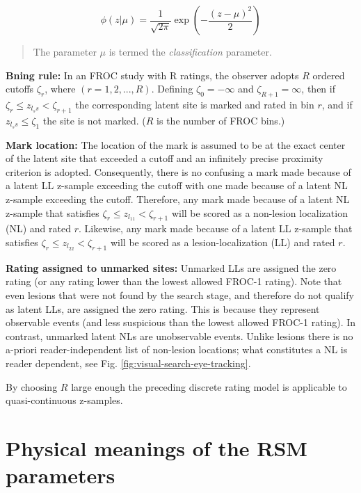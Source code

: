 \documentclass[
]{book}
\begin{document}
\begin{equation} 
\phi\left ( z | \mu \right )=\frac{1}{\sqrt{2\pi}}\exp\left ( -\frac{(z-\mu)^2}{2} \right )
\label{eq:rsm-pdf-phi-mu}
\end{equation}

\begin{quote}
The parameter \(\mu\) is termed the \emph{classification} parameter.
\end{quote}

\textbf{Bning rule:} In an FROC study with R ratings, the observer adopts \(R\) ordered cutoffs \(\zeta_r\), where \(\left ( r = 1, 2, ..., R \right )\). Defining \(\zeta_0 = -\infty\) and \(\zeta_{R+1} = \infty\), then if \(\zeta_r \leq z_{l_ss} < \zeta_{r+1}\) the corresponding latent site is marked and rated in bin \(r\), and if \(z_{l_ss} \leq \zeta_1\) the site is not marked. (\(R\) is the number of FROC bins.)

\textbf{Mark location:} The location of the mark is assumed to be at the exact center of the latent site that exceeded a cutoff and an infinitely precise proximity criterion is adopted. Consequently, there is no confusing a mark made because of a latent LL z-sample exceeding the cutoff with one made because of a latent NL z-sample exceeding the cutoff. Therefore, any mark made because of a latent NL z-sample that satisfies \(\zeta_r \leq z_{l_11} < \zeta_{r+1}\) will be scored as a non-lesion localization (NL) and rated \(r\). Likewise, any mark made because of a latent LL z-sample that satisfies \(\zeta_r \leq z_{l_22} < \zeta_{r+1}\) will be scored as a lesion-localization (LL) and rated \(r\).

\textbf{Rating assigned to unmarked sites:} Unmarked LLs are assigned the zero rating (or any rating lower than the lowest allowed FROC-1 rating). Note that even lesions that were not found by the search stage, and therefore do not qualify as latent LLs, are assigned the zero rating. This is because they represent observable events (and less suspicious than the lowest allowed FROC-1 rating). In contrast, unmarked latent NLs are unobservable events. Unlike lesions there is no a-priori reader-independent list of non-lesion locations; what constitutes a NL is reader dependent, see Fig. \ref{fig:visual-search-eye-tracking}.

By choosing \(R\) large enough the preceding discrete rating model is applicable to quasi-continuous z-samples.

\hypertarget{rsm-parameter-physical-meanings}{%
\section{Physical meanings of the RSM parameters}\label{rsm-parameter-physical-meanings}}
\end{document}
